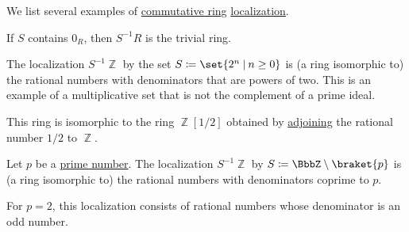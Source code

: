 \begin{example}\label{ex:def:ring_localization}
  We list several examples of \hyperref[def:ring/commutative]{commutative ring} \hyperref[def:ring_localization]{localization}.

  \begin{thmenum}
     If \( S \) contains \( 0_R \), then \( S^{-1} R \) is the trivial ring.

     The localization \( S^{-1} \BbbZ \) by the set \( S \coloneqq \set{ 2^n \given n \geq 0 } \) is (a ring isomorphic to) the rational numbers with denominators that are powers of two. This is an example of a multiplicative set that is not the complement of a prime ideal.

    This ring is isomorphic to the ring \( \BbbZ[1 / 2] \) obtained by \hyperref[thm:adjoining_elements_to_semiring]{adjoining} the rational number \( 1 / 2 \) to \( \BbbZ \).

     Let \( p \) be a \hyperref[def:prime_number]{prime number}. The localization \( S^{-1} \BbbZ \) by \( S \coloneqq \BbbZ \setminus \braket{ p } \) is (a ring isomorphic to) the rational numbers with denominators coprime to \( p \).

    For \( p = 2 \), this localization consists of rational numbers whose denominator is an odd number.
  \end{thmenum}
\end{example}

